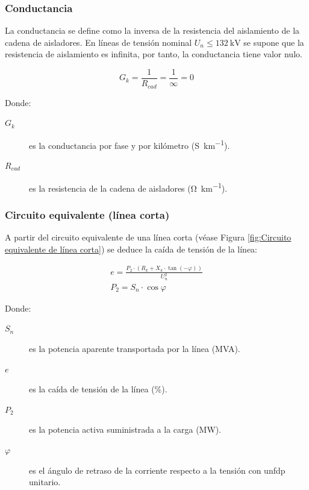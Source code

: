 \subsubsection{Conductancia}
\label{subsubsec:cdt-conductancia}
La conductancia se define como la inversa de la resistencia del aislamiento de la cadena de aisladores. En líneas de tensión nominal $U_n \leq \SI{132}{\kilo\volt}$ se supone que la resistencia de aislamiento es infinita, por tanto, la conductancia tiene valor nulo.

\begin{equation}
\label{eq:cdt-conductancia}
G_k = \frac{1}{R_{cad}} = \frac{1}{\infty} = 0
\end{equation}

Donde:
\begin{description}
  \item[$G_k$] es la conductancia por fase y por kilómetro (\si{\siemens\per\kilo\meter}).
  \item[$R_{cad}$] es la resistencia de la cadena de aisladores (\si{\ohm\per\kilo\meter}).
\end{description}

\subsubsection{Circuito equivalente (línea corta)}
\label{subsubsec:circuito-equivalente}


A partir del circuito equivalente de una línea corta (véase Figura \ref{fig:Circuito equivalente de línea corta}) se deduce la caída de tensión de la línea:

\begin{gather}
e = \frac{P_2 \cdot (R_k + X_k \cdot \tan(-\varphi))}{U_n^2}
\label{eq:cdt-e} \\[0.5em]
P_2 = S_n \cdot \cos\varphi
\label{cdt-P2} 
\end{gather}

Donde:
\begin{description}
  \item[$S_n$] es la potencia aparente transportada por la línea (\si{MVA}).
  \item[$e$] es la caída de tensión de la línea (\si{\percent}).
  \item[$P_2$] es la potencia activa suministrada a la carga (\si{\mega\watt}).
  \item[$\varphi$] es el ángulo de retraso de la corriente respecto a la tensión con un\ac{fdp} unitario.
\end{description}

